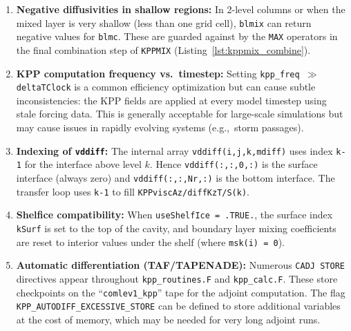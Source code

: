 \documentclass[12pt,letterpaper]{article}
\begin{document}
\begin{enumerate}[leftmargin=*, label=\textbf{\arabic*.}]  
  
  \item \textbf{Negative diffusivities in shallow regions:} In 2-level  
        columns or when the mixed layer is very shallow (less than one  
        grid cell), \texttt{blmix} can return negative values for  
        \texttt{blmc}. These are guarded against by the \texttt{MAX}  
        operators in the final combination step of \texttt{KPPMIX}  
        (Listing~\ref{lst:kppmix_combine}).  
  
  \item \textbf{KPP computation frequency vs.\ timestep:} Setting  
        \texttt{kpp\_freq $\gg$ deltaTClock} is a common efficiency  
        optimization but can cause subtle inconsistencies: the KPP  
        fields are applied at every model timestep using stale forcing  
        data. This is generally acceptable for large-scale simulations  
        but may cause issues in rapidly evolving systems (e.g.,\ storm  
        passages).  
  
  \item \textbf{Indexing of \texttt{vddiff}:} The internal array  
        \texttt{vddiff(i,j,k,mdiff)} uses index \texttt{k-1} for the  
        interface above level $k$. Hence \texttt{vddiff(:,:,0,:)} is  
        the surface interface (always zero) and \texttt{vddiff(:,:,Nr,:)}  
        is the bottom interface. The transfer loop uses \texttt{k-1} to  
        fill \texttt{KPPviscAz/diffKzT/S(k)}.  
  
  \item \textbf{Shelfice compatibility:} When \texttt{useShelfIce = .TRUE.},  
        the surface index \texttt{kSurf} is set to the top of the cavity,  
        and boundary layer mixing coefficients are reset to interior  
        values under the shelf (where \texttt{msk(i) = 0}).  
  
  \item \textbf{Automatic differentiation (TAF/TAPENADE):} Numerous  
        \texttt{CADJ STORE} directives appear throughout  
        \texttt{kpp\_routines.F} and \texttt{kpp\_calc.F}. These store  
        checkpoints on the ``\texttt{comlev1\_kpp}'' tape for the  
        adjoint computation. The flag \texttt{KPP\_AUTODIFF\_EXCESSIVE\_STORE}  
        can be defined to store additional variables at the cost of  
        memory, which may be needed for very long adjoint runs.  
  
\end{enumerate}  
  
\end{document}
